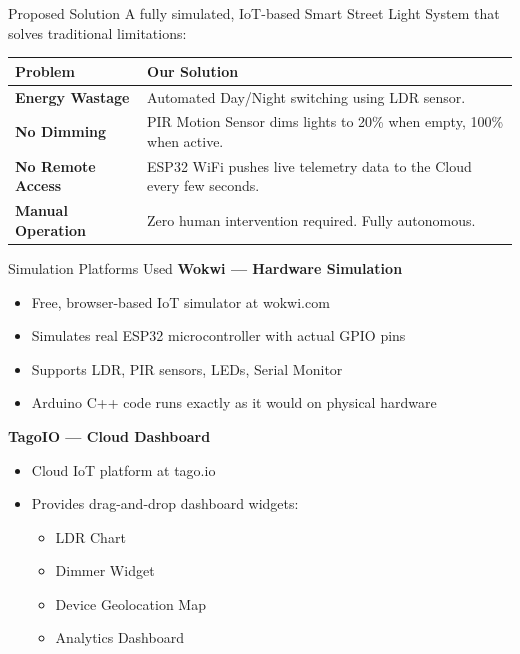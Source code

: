 \documentclass[aspectratio=169]{beamer}
\begin{document}
\begin{frame}{Proposed Solution}
    A fully simulated, IoT-based Smart Street Light System that solves traditional limitations:
    \vspace{0.5cm}
    \begin{table}[]
        \begin{tabularx}{\textwidth}{@{}lX@{}}
            \toprule
            \textbf{Problem} & \textbf{Our Solution} \\
            \midrule
            \textbf{Energy Wastage} & Automated Day/Night switching using LDR sensor. \\ 
            \addlinespace
            \textbf{No Dimming} & PIR Motion Sensor dims lights to 20\% when empty, 100\% when active. \\ 
            \addlinespace
            \textbf{No Remote Access} & ESP32 WiFi pushes live telemetry data to the Cloud every few seconds. \\ 
            \addlinespace
            \textbf{Manual Operation} & Zero human intervention required. Fully autonomous. \\
            \bottomrule
        \end{tabularx}
    \end{table}
\end{frame}

\begin{frame}{Simulation Platforms Used}
    \textbf{Wokwi — Hardware Simulation}
    \begin{itemize}
        \item Free, browser-based IoT simulator at wokwi.com
        \item Simulates real ESP32 microcontroller with actual GPIO pins
        \item Supports LDR, PIR sensors, LEDs, Serial Monitor
        \item Arduino C++ code runs exactly as it would on physical hardware
    \end{itemize}
    \vspace{0.5cm}
    \textbf{TagoIO — Cloud Dashboard}
    \begin{itemize}
        \item Cloud IoT platform at tago.io
        \item Provides drag-and-drop dashboard widgets:
        \begin{itemize}
            \item LDR Chart
            \item Dimmer Widget
            \item Device Geolocation Map
            \item Analytics Dashboard
        \end{itemize}
    \end{itemize}
\end{frame}
\end{document}
